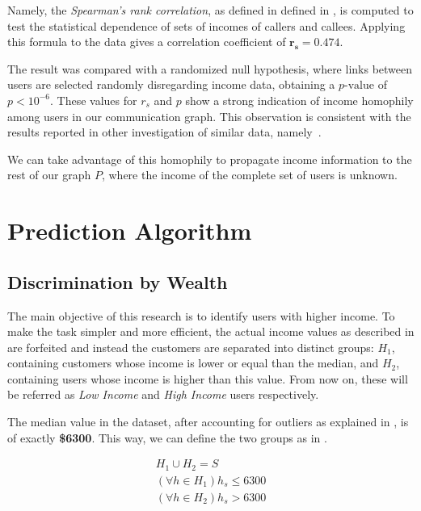 Namely, the \textit{Spearman's rank correlation}, as defined in defined in , is computed to test the statistical dependence of sets of incomes of callers and callees. Applying this formula to the data gives a correlation coefficient of $\mathbf{r_s = 0.474}$.

The result was compared with a randomized null hypothesis, where links between users are selected randomly disregarding income data, obtaining a $p\text{-value}$ of $p < 10^{-6}$. These values for $r_s$ and $p$ show a strong indication of income homophily among users in our communication graph. This observation is consistent with the results reported in other investigation of similar data, namely~\cite{leo2015socioeconomic}.

We can take advantage of this homophily to propagate income information to the rest of our graph $P$, where the income of the complete set of users is unknown.

\section{Prediction Algorithm}
\label{subsec:prediction_algorithm}

\subsection{Discrimination by Wealth}
\label{subsec:discrimination_by_wealth}

The main objective of this research is to identify users with higher income. To make the task simpler and more efficient, the actual income values as described in  are forfeited and instead the customers are separated into distinct groups: $H_1$, containing customers whose income is lower or equal than the median, and $H_2$, containing users whose income is higher than this value. From now on, these will be referred as \emph{Low Income} and \emph{High Income} users respectively.

The median value in the dataset, after accounting for outliers as explained in , is of exactly \textbf{\$6300}. This way, we can define the two groups as in .

\begin{equation}
\label{eq:h}
\begin{gathered}
H_1 \cup H_2 = S \\
\left( \forall h \in H_1 \right) h_s \leq 6300 \\
\left( \forall h \in H_2 \right) h_s > 6300
\end{gathered}
\end{equation}

